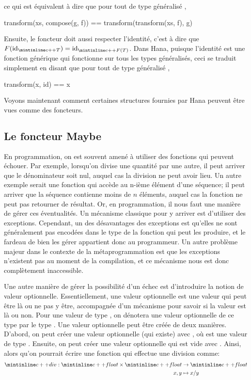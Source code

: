 ce qui est équivalent à dire que pour tout  de type généralisé ,
\begin{cpp}
    transform(xs, compose(g, f)) == transform(transform(xs, f), g)
\end{cpp}

Ensuite, le foncteur doit aussi respecter l'identité, c'est à dire que
$F(\id_{\cc{T}}) = \id_{\cc{F(T)}}$. Dans Hana, puisque l'identité est une
fonction générique qui fonctionne sur tous les types généralisés, ceci se
traduit simplement en disant que pour tout  de type généralisé ,
\begin{cpp}
    transform(x, id) == x
\end{cpp}

Voyons maintenant comment certaines structures fournies par Hana peuvent
être vues comme des foncteurs.


\subsection{Le foncteur Maybe}
En programmation, on est souvent amené à utiliser des fonctions qui peuvent
échouer. Par exemple, lorsqu'on divise une quantité par une autre, il peut
arriver que le dénominateur soit nul, auquel cas la division ne peut avoir
lieu. Un autre exemple serait une fonction qui accède au n-ième élément
d'une séquence; il peut arriver que la séquence contienne moins de $n$
éléments, auquel cas la fonction ne peut pas retourner de résultat. Or,
en programmation, il nous faut une manière de gérer ces éventualités. Un
mécanisme classique pour y arriver est d'utiliser des exceptions. Cependant,
un des désavantages des exceptions est qu'elles ne sont généralement pas
encodées dans le type de la fonction qui peut les produire, et le fardeau
de bien les gérer appartient donc au programmeur. Un autre problème majeur
dans le contexte de la métaprogrammation est que les exceptions n'existent
pas au moment de la compilation, et ce mécanisme nous est donc complètement
inaccessible.

Une autre manière de gérer la possibilité d'un échec est d'introduire la
notion de valeur optionnelle. Essentiellement, une valeur optionnelle est
une valeur qui peut être là ou ne pas y être, accompagnée d'un mécanisme
pour savoir si la valeur est là ou non. Pour une valeur de type ,
on dénotera une valeur optionnelle de ce type par le type .
Une valeur optionnelle peut être créée de deux manières. D'abord, on peut
créer une valeur optionnelle (qui existe) avec , où 
est une valeur de type . Ensuite, on peut créer une valeur optionnelle
qui est vide avec . Ainsi, alors qu'on pourrait écrire une
fonction qui effectue une division comme:
\begin{align*}
    \cc{div} : \cc{float} \times \cc{float} &\to \cc{float} \\
                                       x, y &\mapsto x / y
\end{align*}

